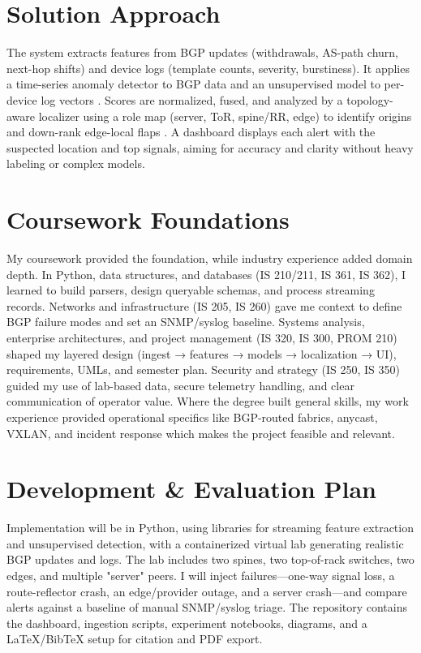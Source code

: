 \documentclass[11pt]{article}
\begin{document}
\section{Solution Approach}

The system extracts features from BGP updates (withdrawals, AS-path churn, next-hop shifts) and device logs (template counts, severity, burstiness). It applies a time-series anomaly detector to BGP data \cite{scott2024} and an unsupervised model to per-device log vectors \cite{cheng2021}. Scores are normalized, fused, and analyzed by a topology-aware localizer using a role map (server, ToR, spine/RR, edge) to identify origins and down-rank edge-local flaps \cite{tan2024}. A dashboard displays each alert with the suspected location and top signals, aiming for accuracy and clarity without heavy labeling or complex models.

\section{Coursework Foundations}

My coursework provided the foundation, while industry experience added domain depth. In Python, data structures, and databases (IS 210/211, IS 361, IS 362), I learned to build parsers, design queryable schemas, and process streaming records. Networks and infrastructure (IS 205, IS 260) gave me context to define BGP failure modes and set an SNMP/syslog baseline. Systems analysis, enterprise architectures, and project management (IS 320, IS 300, PROM 210) shaped my layered design (ingest → features → models → localization → UI), requirements, UMLs, and semester plan. Security and strategy (IS 250, IS 350) guided my use of lab-based data, secure telemetry handling, and clear communication of operator value. Where the degree built general skills, my work experience provided operational specifics like BGP-routed fabrics, anycast, VXLAN, and incident response which makes the project feasible and relevant.

\section{Development \& Evaluation Plan}

Implementation will be in Python, using libraries for streaming feature extraction and unsupervised detection, with a containerized virtual lab generating realistic BGP updates and logs. The lab includes two spines, two top-of-rack switches, two edges, and multiple "server" peers. I will inject failures—one-way signal loss, a route-reflector crash, an edge/provider outage, and a server crash—and compare alerts against a baseline of manual SNMP/syslog triage. The repository contains the dashboard, ingestion scripts, experiment notebooks, diagrams, and a LaTeX/BibTeX setup for citation and PDF export.
\end{document}
